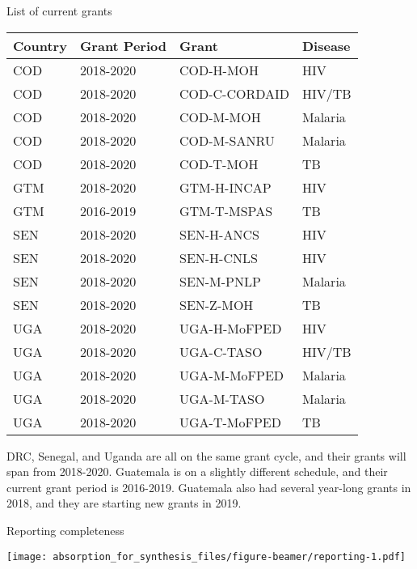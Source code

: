 \documentclass[ignorenonframetext,]{beamer}
\begin{document}
\begin{frame}{List of current grants}
\protect\hypertarget{list-of-current-grants}{}

\begin{table}[H]
\centering\begingroup\fontsize{6}{8}\selectfont

\begin{tabular}{l|l|l|l}
\hline
Country & Grant Period & Grant & Disease\\
\hline
COD & 2018-2020 & COD-H-MOH & HIV\\
\hline
COD & 2018-2020 & COD-C-CORDAID & HIV/TB\\
\hline
COD & 2018-2020 & COD-M-MOH & Malaria\\
\hline
COD & 2018-2020 & COD-M-SANRU & Malaria\\
\hline
COD & 2018-2020 & COD-T-MOH & TB\\
\hline
GTM & 2018-2020 & GTM-H-INCAP & HIV\\
\hline
GTM & 2016-2019 & GTM-T-MSPAS & TB\\
\hline
SEN & 2018-2020 & SEN-H-ANCS & HIV\\
\hline
SEN & 2018-2020 & SEN-H-CNLS & HIV\\
\hline
SEN & 2018-2020 & SEN-M-PNLP & Malaria\\
\hline
SEN & 2018-2020 & SEN-Z-MOH & TB\\
\hline
UGA & 2018-2020 & UGA-H-MoFPED & HIV\\
\hline
UGA & 2018-2020 & UGA-C-TASO & HIV/TB\\
\hline
UGA & 2018-2020 & UGA-M-MoFPED & Malaria\\
\hline
UGA & 2018-2020 & UGA-M-TASO & Malaria\\
\hline
UGA & 2018-2020 & UGA-T-MoFPED & TB\\
\hline
\end{tabular}\endgroup{}
\end{table}

DRC, Senegal, and Uganda are all on the same grant cycle, and their
grants will span from 2018-2020. Guatemala is on a slightly different
schedule, and their current grant period is 2016-2019. Guatemala also
had several year-long grants in 2018, and they are starting new grants
in 2019.

\end{frame}

\begin{frame}{Reporting completeness}
\protect\hypertarget{reporting-completeness}{}

\texttt{[image: absorption\_for\_synthesis\_files/figure-beamer/reporting-1.pdf]}

\end{frame}
\end{document}
